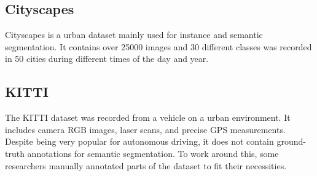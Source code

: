 \subsection{Cityscapes}
Cityscapes is a urban dataset mainly used for instance and semantic segmentation. It contains over 25000 images and 30 different classes was recorded in 50 cities during different times of the day and year.

\subsection{KITTI}
The KITTI dataset \cite{Geiger2013IJRR} was recorded from a vehicle on a urban environment. It includes camera RGB images, laser scans, and precise GPS measurements. Despite being very popular for autonomous driving, it does not contain ground-truth annotations for semantic segmentation. To work around this, some researchers manually annotated parts of the dataset to fit their necessities. 
